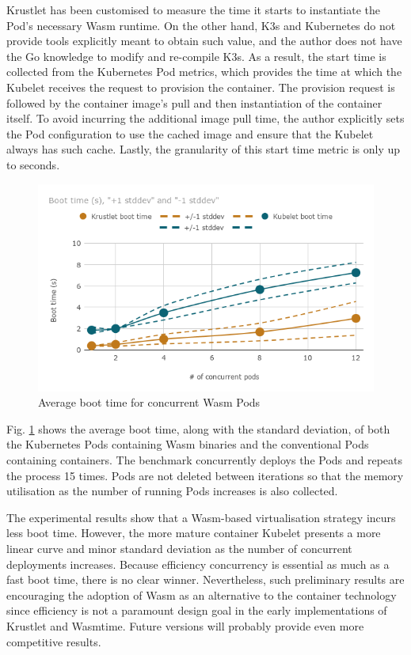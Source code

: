 Krustlet has been customised to measure the time it starts to instantiate the Pod's necessary Wasm runtime. On the other hand, K3s and Kubernetes do not provide tools explicitly meant to obtain such value, and the author does not have the Go knowledge to modify and re-compile K3s. As a result, the start time is collected from the Kubernetes Pod metrics, which provides the time at which the Kubelet receives the request to provision the container. The provision request is followed by the container image's pull and then instantiation of the container itself. To avoid incurring the additional image pull time, the author explicitly sets the Pod configuration to use the cached image and ensure that the Kubelet always has such cache. Lastly, the granularity of this start time metric is only up to seconds.

\begin{figure}[h]
\centering
\includegraphics[width=\columnwidth]{figures/b-krustlet-1}
\caption{Average boot time for concurrent Wasm Pods \label{fig:b-krustlet-1}}
\end{figure}

Fig. \ref{fig:b-krustlet-1} shows the average boot time, along with the standard deviation, of both the Kubernetes Pods containing Wasm binaries and the conventional Pods containing containers. The benchmark concurrently deploys the Pods and repeats the process 15 times. Pods are not deleted between iterations so that the memory utilisation as the number of running Pods increases is also collected.

The experimental results show that a Wasm-based virtualisation strategy incurs less boot time. However, the more mature container Kubelet presents a more linear curve and minor standard deviation as the number of concurrent deployments increases. Because efficiency concurrency is essential as much as a fast boot time, there is no clear winner. Nevertheless, such preliminary results are encouraging the adoption of Wasm as an alternative to the container technology since efficiency is not a paramount design goal in the early implementations of Krustlet and Wasmtime. Future versions will probably provide even more competitive results.

